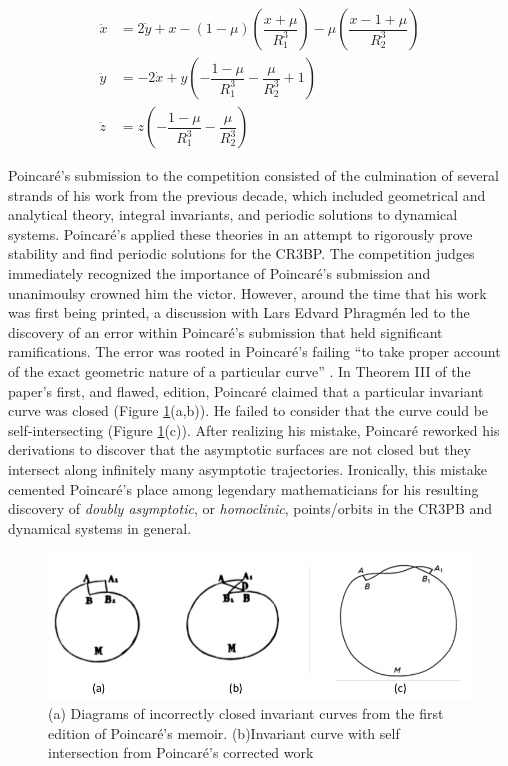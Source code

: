 \documentclass[11pt]{article} %
\begin{document}
\begin{align}
\ddot{x} &=  2\dot{y} + x - (1-\mu)\left(\dfrac{x+\mu}{R_1^3}\right) - \mu\left(\dfrac{x-1+\mu}{R_2^3}\right) \label{eomx}\\
\ddot{y} &= - 2\dot{x} + y\left(-\dfrac{1-\mu}{R_1^3} - \dfrac{\mu}{R_2^3} + 1\right) \label{eomy}\\
\ddot{z} &= z\left(-\dfrac{1 - \mu}{R_1^3} - \dfrac{\mu}{R_2^3}\right) \label{eomz}
\end{align}

Poincaré's submission to the competition consisted of the culmination of several strands of his work from the previous decade, which included geometrical and analytical theory, integral invariants, and periodic solutions to dynamical systems. Poincaré's applied these theories in an attempt to rigorously prove stability and find periodic solutions for the CR3BP. The competition judges immediately recognized the importance of Poincaré's submission and unanimoulsy crowned him the victor. However, around the time that his work was first being printed, a discussion with Lars Edvard Phragmén led to the discovery of an error within Poincaré's submission that held significant ramifications. The error was rooted in Poincaré's failing ``to take proper account of the exact geometric nature of a particular curve'' \cite{BarrowGreen1997}. In Theorem III of the paper's first, and flawed, edition, Poincaré claimed that a particular invariant curve was closed (Figure \ref{fig:curveIntersection1}(a,b)). He failed to consider that the curve could be self-intersecting (Figure \ref{fig:curveIntersection1}(c)). After realizing his mistake, Poincaré reworked his derivations to discover that the asymptotic surfaces are not closed but they intersect along infinitely many asymptotic trajectories. Ironically, this mistake cemented Poincaré's place among legendary mathematicians for his resulting discovery of \textit{doubly asymptotic}, or \textit{homoclinic}, points/orbits in the CR3PB and dynamical systems in general.  

\begin{figure}[H]
\centering
\includegraphics[width=5in]{curveIntersection1.png}\nonumber
\caption{(a) Diagrams of incorrectly closed invariant curves from the first edition of Poincaré's memoir. (b)Invariant curve with self intersection from Poincaré's corrected work \cite{BarrowGreen1997}}
\label{fig:curveIntersection1}
\end{figure}
\end{document}
